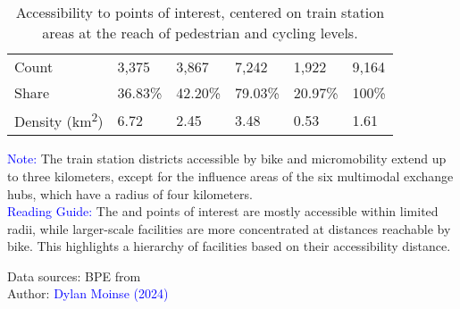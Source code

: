 \begin{table}[h!]
{\begin{tabular}{p{}p{}p{}p{}p{}p{}}
\small{Count} & \small{3,375} & \small{3,867} & \small{7,242} & \small{1,922} & \small{9,164}\\
\small{Share} & \small{36.83\%} & \small{42.20\%} & \small{79.03\%} & \small{20.97\%} & \small{100\%}\\
\small{Density (km\textsuperscript{2})} & \small{6.72} & \small{2.45} & \small{3.48} &	\small{0.53} & \small{1.61}\\
        \hline
        \end{tabular}}
    \caption{Accessibility to points of interest, centered on train station areas at the reach of pedestrian and cycling levels.}
    \label{table-chap5:accessibilite-poi}
        \vspace{5pt}
        \begin{flushleft}\scriptsize{
        \textcolor{blue}{Note:} The train station districts accessible by bike and micromobility extend up to three kilometers, except for the influence areas of the six multimodal exchange hubs, which have a radius of four kilometers.
        \\
        \textcolor{blue}{Reading Guide:} The  and  points of interest are mostly accessible within limited radii, while larger-scale facilities are more concentrated at distances reachable by bike. This highlights a hierarchy of facilities based on their accessibility distance.
        }\end{flushleft}
        \begin{flushright}\scriptsize
        Data sources: \acrfull{BPE} from \textcolor{blue}{\textcite{insee_base_2021}}
        \\
        Author: \textcolor{blue}{Dylan Moinse (2024)}
        \end{flushright}
        \end{table}